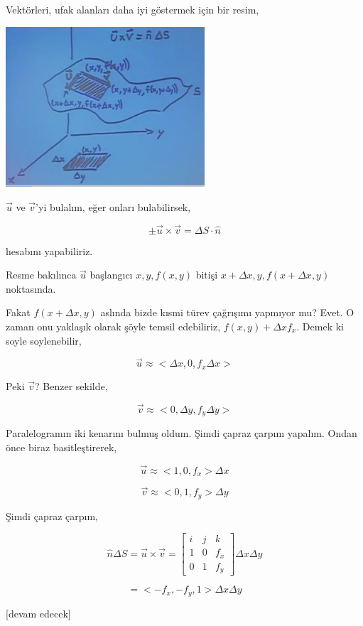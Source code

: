 \documentclass[12pt,fleqn]{article}\usepackage{../../common}
\begin{document}
Vektörleri, ufak alanları daha iyi göstermek için bir resim,

\includegraphics[width=20em]{calc_multi_28_03.png}

$\vec{u}$ ve $\vec{v}$'yi bulalım, eğer onları bulabilirsek,

$$
\pm \vec{u} \times \vec{v} = \Delta S \cdot \hat{n}
$$

hesabını yapabiliriz.

Resme bakılınca $\vec{u}$ başlangıcı $x,y,f(x,y)$ bitişi $x+\Delta
x,y,f(x+\Delta x,y)$ noktasında.

Fakat $f(x+\Delta x,y)$ aslında bizde kısmi türev çağrışımı yapmıyor mu?
Evet. O zaman onu yaklaşık olarak şöyle temsil edebiliriz,
$f(x,y) + \Delta x f_x$. Demek ki soyle soylenebilir,

$$
\vec{u} \approx < \Delta x, 0, f_x \Delta x >
$$

Peki $\vec{v}$? Benzer sekilde,

$$
\vec{v} \approx < 0, \Delta y, f_y \Delta y >
$$

Paralelogramın iki kenarını bulmuş oldum. Şimdi çapraz çarpım yapalım. Ondan
önce biraz basitleştirerek,

$$
\vec{u} \approx < 1, 0, f_x  > \Delta x
$$

$$
\vec{v} \approx < 0, 1, f_y  > \Delta y
$$

Şimdi çapraz çarpım,

$$
\hat{n} \Delta S =
\vec{u} \times \vec{v} =
\left[\begin{array}{ccc}
i & j & k \\
1 & 0 & f_x \\
0 & 1 & f_y
\end{array}\right]
\Delta x \Delta y
$$

$$
= < -f_x, -f_y, 1 > \Delta x \Delta y
$$















[devam edecek]
\end{document}
